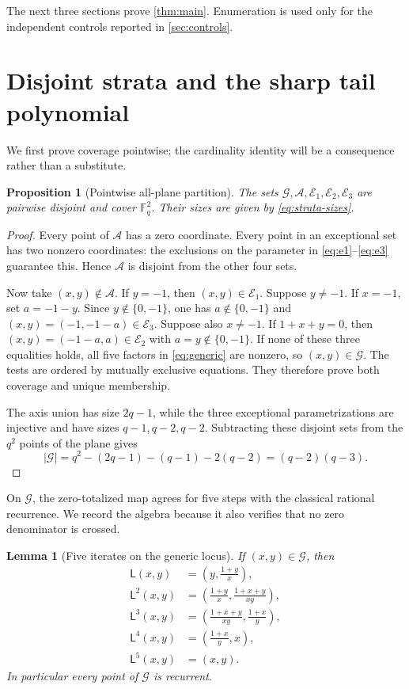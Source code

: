 \documentclass[10pt,a4paper]{amsart}
\newtheorem{proposition}[theorem]{Proposition}
\newtheorem{lemma}[theorem]{Lemma}
\theoremstyle{definition}
\theoremstyle{remark}
\newcommand{\F}{\mathbb F}
\newcommand{\G}{\mathcal G}
\newcommand{\A}{\mathcal A}
\newcommand{\E}{\mathcal E}
\newcommand{\Lyn}{\mathsf L}
\begin{document}
The next three sections prove \cref{thm:main}.  Enumeration is used only for
the independent controls reported in \cref{sec:controls}.

\section{Disjoint strata and the sharp tail polynomial}

We first prove coverage pointwise; the cardinality identity will be a
consequence rather than a substitute.

\begin{proposition}[Pointwise all-plane partition]\label{prop:partition}
The sets $\G,\A,\E_1,\E_2,\E_3$ are pairwise disjoint and cover $\F_q^2$.
Their sizes are given by \eqref{eq:strata-sizes}.
\end{proposition}

\begin{proof}
Every point of $\A$ has a zero coordinate.  Every point in an exceptional
set has two nonzero coordinates: the exclusions on the parameter in
\eqref{eq:e1}--\eqref{eq:e3} guarantee this.  Hence $\A$ is disjoint from
the other four sets.

Now take $(x,y)\notin\A$.  If $y=-1$, then $(x,y)\in\E_1$.  Suppose
$y\ne-1$.  If $x=-1$, set $a=-1-y$.  Since $y\notin\{0,-1\}$, one has
$a\notin\{0,-1\}$ and $(x,y)=(-1,-1-a)\in\E_3$.  Suppose also $x\ne-1$.
If $1+x+y=0$, then $(x,y)=(-1-a,a)\in\E_2$ with $a=y\notin\{0,-1\}$.
If none of these three equalities holds, all five factors in
\eqref{eq:generic} are nonzero, so $(x,y)\in\G$.  The tests are ordered by
mutually exclusive equations.  They therefore prove both coverage and
unique membership.

The axis union has size $2q-1$, while the three exceptional parametrizations
are injective and have sizes $q-1,q-2,q-2$.  Subtracting these disjoint sets
from the $q^2$ points of the plane gives
\[
 |\G|=q^2-(2q-1)-(q-1)-2(q-2)=(q-2)(q-3).
\]
\end{proof}

On $\G$, the zero-totalized map agrees for five steps with the classical
rational recurrence.  We record the algebra because it also verifies that
no zero denominator is crossed.

\begin{lemma}[Five iterates on the generic locus]\label{lem:five}
If $(x,y)\in\G$, then
\begin{align}
 \Lyn(x,y)&=\left(y,\frac{1+y}{x}\right),\nonumber\\
 \Lyn^2(x,y)&=\left(\frac{1+y}{x},
                  \frac{1+x+y}{xy}\right),\nonumber\\
 \Lyn^3(x,y)&=\left(\frac{1+x+y}{xy},
                  \frac{1+x}{y}\right),\label{eq:five-iterates}\\
 \Lyn^4(x,y)&=\left(\frac{1+x}{y},x\right),\nonumber\\
 \Lyn^5(x,y)&=(x,y).\nonumber
\end{align}
In particular every point of $\G$ is recurrent.
\end{lemma}
\end{document}
